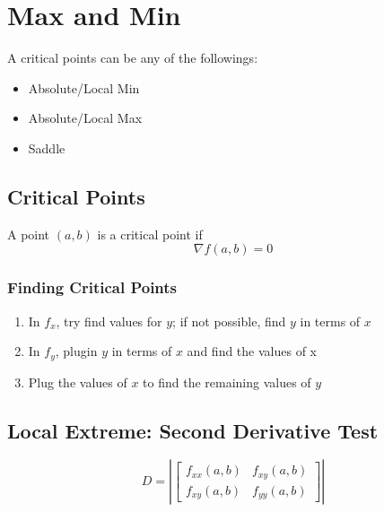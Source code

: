 \section{Max and Min}

  A critical points can be any of the followings:
  \begin{itemize}
    \item Absolute/Local Min
    \item Absolute/Local Max
    \item Saddle
  \end{itemize}

  \subsection{Critical Points}

    A point $ \left( a, b \right) $ is a critical point if
    \begin{equation}
      \nabla f \left( a, b \right) = 0
    \end{equation}

    \subsubsection{Finding Critical Points}

      \begin{enumerate}
        \item In $ f_{x} $, try find values for $ y $; if not possible,
        find $ y $ in terms of $ x $
        \item In $ f_{y} $, plugin $ y $ in terms of $ x $ and find the values
        of x
        \item Plug the values of $ x $ to find the remaining values of $ y $
      \end{enumerate}

  \subsection{Local Extreme: Second Derivative Test}

    \begin{equation}
      D =
      \left|
        \begin{bmatrix}
          f_{xx} (a, b) & f_{xy} (a, b) \\
          f_{xy} (a, b) & f_{yy} (a, b)
        \end{bmatrix}
      \right|
    \end{equation}

